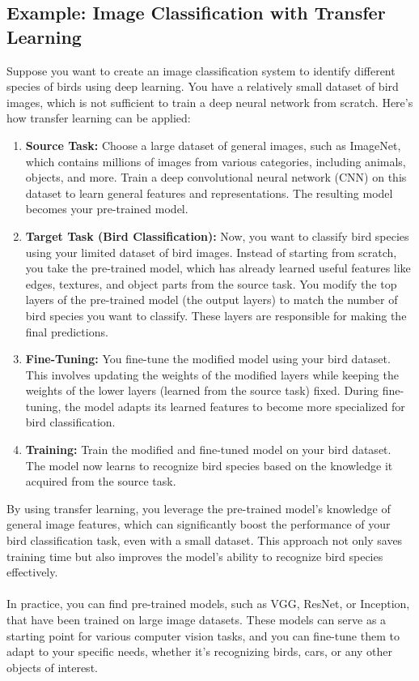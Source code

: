 \documentclass[12pt,a4paper,twoside]{article}
\begin{document}
	\subsection{Example: Image Classification with Transfer Learning}
	Suppose you want to create an image classification system to identify different species of birds using deep learning. You have a relatively small dataset of bird images, which is not sufficient to train a deep neural network from scratch. Here's how transfer learning can be applied:
	\begin{enumerate}
		\item \textbf{Source Task:} Choose a large dataset of general images, such as ImageNet, which contains millions of images from various categories, including animals, objects, and more.
		Train a deep convolutional neural network (CNN) on this dataset to learn general features and representations. The resulting model becomes your pre-trained model.
		
		\item \textbf{Target Task (Bird Classification):} Now, you want to classify bird species using your limited dataset of bird images.
		Instead of starting from scratch, you take the pre-trained model, which has already learned useful features like edges, textures, and object parts from the source task.
		You modify the top layers of the pre-trained model (the output layers) to match the number of bird species you want to classify. These layers are responsible for making the final predictions.
		
		\item \textbf{Fine-Tuning:} You fine-tune the modified model using your bird dataset. This involves updating the weights of the modified layers while keeping the weights of the lower layers (learned from the source task) fixed. During fine-tuning, the model adapts its learned features to become more specialized for bird classification.
		
		\item \textbf{Training:} Train the modified and fine-tuned model on your bird dataset. The model now learns to recognize bird species based on the knowledge it acquired from the source task.
	\end{enumerate}
	By using transfer learning, you leverage the pre-trained model's knowledge of general image features, which can significantly boost the performance of your bird classification task, even with a small dataset. This approach not only saves training time but also improves the model's ability to recognize bird species effectively.
	\\\\
	In practice, you can find pre-trained models, such as VGG, ResNet, or Inception, that have been trained on large image datasets. These models can serve as a starting point for various computer vision tasks, and you can fine-tune them to adapt to your specific needs, whether it's recognizing birds, cars, or any other objects of interest.
\end{document}
